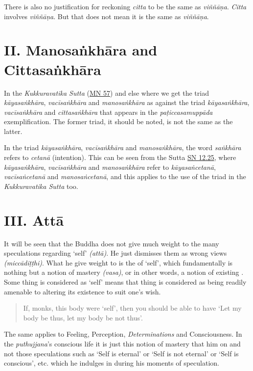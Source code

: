 There is also no justification for reckoning \emph{citta} to be the same as \emph{viññāṇa}. \emph{Citta} involves \emph{viññāṇa}. But that does not mean it is the same as \emph{viññāṇa}.

\section{II. Manosaṅkhāra and Cittasaṅkhāra}

In the \emph{Kukkuravatika Sutta} (\href{https://suttacentral.net/mn57/en/bodhi}{MN 57}) and else where we get the triad \emph{kāyasaṅkhāra}, \emph{vacīsaṅkhāra} and \emph{manosaṅkhāra} as against the triad \emph{kāyasaṅkhāra}, \emph{vacīsaṅkhāra} and \emph{cittasaṅkhāra} that appears in the \emph{paṭiccasamuppāda} exemplification. The former triad, it should be noted, is not the same as the latter.

In the triad \emph{kāyasaṅkhāra}, \emph{vacīsaṅkhāra} and \emph{manosaṅkhāra}, the word \emph{saṅkhāra} refers to \emph{cetanā} (intention). This can be seen from the Sutta \href{https://suttacentral.net/sn12.25/en/bodhi}{SN 12.25}, where \emph{kāyasaṅkhāra}, \emph{vacīsaṅkhāra} and \emph{manosaṅkhāra} refer to \emph{kāyasaṅcetanā}, \emph{vacīsaṅcetanā} and \emph{manosaṅcetanā}, and this applies to the use of the triad in the \emph{Kukkuravatika Sutta} too.

\section{III. Attā}

It will be seen that the Buddha does not give much weight to the many speculations regarding `self' \emph{(attā)}. He just dismisses them as wrong views \emph{(miccādiṭṭhi)}. What he  give weight to is the  of `self', which fundamentally is nothing but a notion of mastery \emph{(vasa)}, or in other words, a notion of existing . Some thing is considered as `self' means that thing is considered as being readily amenable to altering its existence to suit one's wish.

\begin{quote}
If, monks, this body were `self', then you should be able to have `Let my body be thus, let my body be not thus'.
\end{quote}

The same applies to Feeling, Perception, \emph{Determinations} and Consciousness. In the \emph{puthujjana}'s conscious life it is just this notion of mastery that  him on and not those speculations such as `Self is eternal' or `Self is not eternal' or `Self is conscious', etc. which he indulges in during his moments of speculation.

